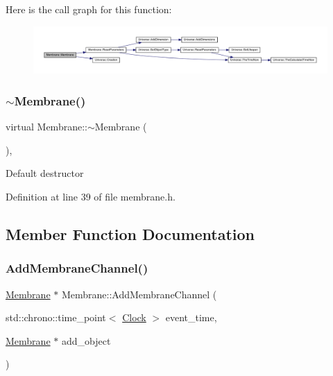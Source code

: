 Here is the call graph for this function\+:
\nopagebreak
\begin{figure}[H]
\begin{center}
\leavevmode
\includegraphics[width=350pt]{class_membrane_a8d61894d90a7f63e427cd8b1a5eca380_cgraph}
\end{center}
\end{figure}
\mbox{\label{class_membrane_a8765daf8038c1e992e3ea3752db0042f}} 
\subsubsection{\texorpdfstring{$\sim$\+Membrane()}{~Membrane()}}
{\footnotesize\ttfamily virtual Membrane\+::$\sim$\+Membrane (\begin{DoxyParamCaption}{ }\end{DoxyParamCaption})\hspace{0.3cm}{\ttfamily [inline]}, {\ttfamily [virtual]}}

Default destructor 

Definition at line 39 of file membrane.\+h.



\subsection{Member Function Documentation}
\mbox{\label{class_membrane_a3e3b4f55f028541e7513f826d01a689a}} 
\subsubsection{\texorpdfstring{Add\+Membrane\+Channel()}{AddMembraneChannel()}}
{\footnotesize\ttfamily \hyperlink{class_membrane}{Membrane} $\ast$ Membrane\+::\+Add\+Membrane\+Channel (\begin{DoxyParamCaption}\item[{std\+::chrono\+::time\+\_\+point$<$ \hyperlink{universe_8h_a0ef8d951d1ca5ab3cfaf7ab4c7a6fd80}{Clock} $>$}]{event\+\_\+time,  }\item[{\hyperlink{class_membrane}{Membrane} $\ast$}]{add\+\_\+object }\end{DoxyParamCaption})}



